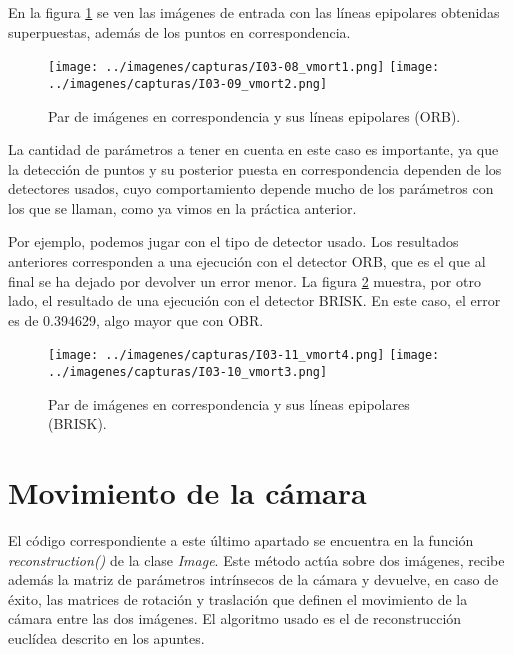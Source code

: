 \documentclass[a4paper, 11pt]{article}
\theoremstyle{definition}
\theoremstyle{theorem}
\begin{document}
    En la figura \ref{fig:vmort} se ven las imágenes de entrada con las líneas epipolares obtenidas superpuestas, además de los puntos en correspondencia.

    \begin{figure}[!htb]
        \texttt{[image: ../imagenes/capturas/I03-08\_vmort1.png]}
        \endminipage\hfill
        \texttt{[image: ../imagenes/capturas/I03-09\_vmort2.png]}
        \endminipage
        \caption{Par de imágenes en correspondencia y sus líneas epipolares (ORB).}\label{fig:vmort}
    \end{figure}

    La cantidad de parámetros a tener en cuenta en este caso es importante, ya que la detección de puntos y su posterior puesta en correspondencia dependen de los detectores usados, cuyo comportamiento depende mucho de los parámetros con los que se llaman, como ya vimos en la práctica anterior.

    Por ejemplo, podemos jugar con el tipo de detector usado. Los resultados anteriores corresponden a una ejecución con el detector ORB, que es el que al final se ha dejado por devolver un error menor. La figura \ref{fig:vmort_BRISK} muestra, por otro lado, el resultado de una ejecución con el detector BRISK. En este caso, el error es de 0.394629, algo mayor que con OBR.

    \begin{figure}[!htb]
        \texttt{[image: ../imagenes/capturas/I03-11\_vmort4.png]}
        \endminipage\hfill
        \texttt{[image: ../imagenes/capturas/I03-10\_vmort3.png]}
        \endminipage
        \caption{Par de imágenes en correspondencia y sus líneas epipolares (BRISK).}\label{fig:vmort_BRISK}
    \end{figure}

    \section{Movimiento de la cámara}
    El código correspondiente a este último apartado se encuentra en la función \emph{reconstruction()} de la clase \emph{Image}. Este método actúa sobre dos imágenes, recibe además la matriz de parámetros intrínsecos de la cámara y devuelve, en caso de éxito, las matrices de rotación y traslación que definen el movimiento de la cámara entre las dos imágenes. El algoritmo usado es el de reconstrucción euclídea descrito en los apuntes.
\end{document}
